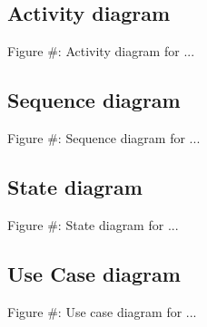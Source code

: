 \subsection{Activity diagram}
	\begin{center}
	    \small{Figure #: Activity diagram for ...}
    \end{center}


\subsection{Sequence diagram}
	\begin{center}
	    \small{Figure #: Sequence diagram for ...}
    \end{center}

\subsection{State diagram}
	\begin{center}
	    \small{Figure #: State diagram for ...}
    \end{center}




\subsection{Use Case diagram}
    \begin{center}
    	\small{Figure #: Use case diagram for ...}
    \end{center}